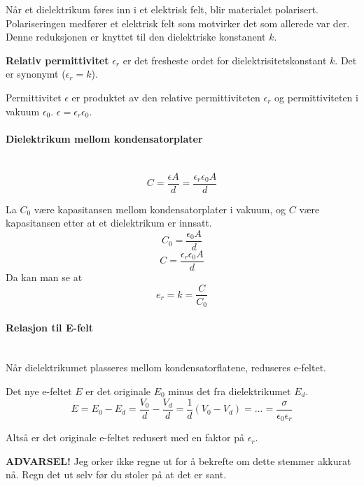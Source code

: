 Når et dielektrikum føres inn i et elektrisk felt, blir materialet polarisert.
Polariseringen medfører et elektrisk felt som motvirker det som
allerede var der.
Denne reduksjonen er knyttet til den dielektriske konstanent $k$.

\textbf{Relativ permittivitet} $\epsilon_r$ er det fresheste ordet for
dielektrisitetskonstant $k$.
Det er synonymt ($\epsilon_r = k$).

Permittivitet $\epsilon$ er produktet av den relative permittiviteten
$\epsilon_r$ og permittiviteten i vakuum $\epsilon_0$.
$\epsilon = \epsilon_r \epsilon_0$.



\paragraph{Dielektrikum mellom kondensatorplater} \hfill \\
$$C = \frac{\epsilon A}{d}
    = \frac{\epsilon_r \epsilon_0 A}{d}$$

La $C_0$ være kapasitansen mellom kondensatorplater i vakuum,
og $C$ være kapasitansen etter at et dielektrikum er innsatt.
$$C_0 = \frac{\epsilon_0 A}{d}$$
$$C = \frac{\epsilon_r \epsilon_0 A}{d}$$
Da kan man se at
$$e_r = k = \frac{C}{C_0}$$


\paragraph{Relasjon til E-felt} \hfill \\
Når dielektrikumet plasseres mellom kondensatorflatene, reduseres e-feltet.

Det nye e-feltet $E$ er det originale $E_0$ minus det fra dielektrikumet $E_d$.
$$E = E_0 - E_d
    = \frac{V_0}{d} - \frac{V_d}{d}
    = \frac{1}{d} (V_0 - V_d)
    = ...
    = \frac{\sigma}{\epsilon_0 \epsilon_r}$$

Altså er det originale e-feltet redusert med en faktor på $\epsilon_r$.

\textbf{ADVARSEL!} Jeg orker ikke regne ut for å bekrefte
om dette stemmer akkurat nå.
Regn det ut selv før du stoler på at det er sant.
